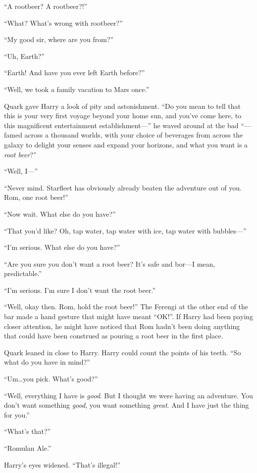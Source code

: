 \documentclass[twoside,letterpaper,12pt]{memoir}
\begin{document}
``A rootbeer? A rootbeer?!''

``What? What's wrong with rootbeer?''

``My good sir, where are you from?''

``Uh, Earth?''

``Earth! And have you ever left Earth before?''

``Well, we took a family vacation to Mars once.''

Quark gave Harry a look of pity and astonishment. ``Do you mean to tell that this is your very first voyage beyond your home sun, and you've come here, to this magnificent entertainment establishment---'' he waved around at the bad ``---famed across a thousand worlds, with your choice of beverages from across the galaxy to delight your senses and expand your horizons, and what you want is a \textit{root beer}?''

``Well, I---''

``Never mind. Starfleet has obviously already beaten the adventure out of you. Rom, one root beer!''

``Now wait. What else do you have?''

``That you'd like? Oh, tap water, tap water with ice, tap water with bubbles---''

``I'm serious. What else do you have?''

``Are you sure you don't want a root beer? It's safe and bor---I mean, predictable.''

``I'm serious. I'm sure I don't want the root beer.''

``Well, okay then. Rom, hold the root beer!'' The Ferengi at the other end of the bar made a hand gesture that might have meant ``OK!''. If Harry had been paying closer attention, he might have noticed that Rom hadn't been doing anything that could have been construed as pouring a root beer in the first place.

Quark leaned in close to Harry. Harry could count the points of his teeth. ``So what do you have in mind?''

``Um\ldots you pick. What's good?''

``Well, everything I have is \textit{good}. But I thought we were having an adventure. You don't want something \textit{good}, you want something \textit{great}. And I have just the thing for you.''

``What's that?''

``Romulan Ale.''

Harry's eyes widened. ``That's illegal!''
\end{document}
